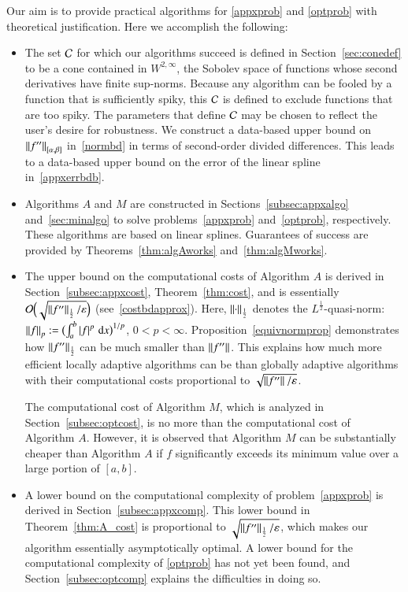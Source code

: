 \documentclass[review]{elsarticle}
\newcommand{\abstol}{\varepsilon}
\theoremstyle{definition}
\renewcommand{\cw}{W}
\begin{document}
Our aim is to provide practical algorithms for \eqref{appxprob} and  \eqref{optprob} with theoretical justification.  Here we accomplish the following:
\begin{itemize}

\item The set $\cc$ for which our algorithms succeed is defined in Section~\ref{sec:conedef} to be a cone contained in $\cw^{2,\infty}$, the Sobolev space of functions whose second derivatives have finite sup-norms.  Because any algorithm can be fooled by a function that is sufficiently spiky, this $\cc$ is defined to exclude functions that are too spiky.  The parameters that define $\cc$ may be chosen to reflect the user's desire for robustness.  We construct a data-based upper bound on $\norm[{[\alpha,\beta]}]{f''}$ in~\eqref{normbd} in terms of second-order divided differences.  This leads to a data-based upper bound on the error of the linear spline in~\eqref{appxerrbdb}.

\item Algorithms $A$ and $M$ are constructed in Sections~\ref{subsec:appxalgo} and~\ref{sec:minalgo} to solve problems~\eqref{appxprob}
and~\eqref{optprob}, respectively.  These algorithms are based on linear splines.  Guarantees of success are provided by Theorems~\ref{thm:algAworks}
and~\ref{thm:algMworks}.

\item The upper bound on the computational costs of Algorithm $A$ is derived in Section~\ref{subsec:appxcost},  Theorem~\ref{thm:cost}, and is essentially $\Order\Bigl(\sqrt{\norm[\frac12]{f''}/\abstol}\Bigr)$ (see~\eqref{costbdapprox}).  Here, $\norm[\frac12]{\cdot}$ denotes the $L^{\frac12}$-quasi-norm:  $\norm[p]{f} := \bigl(\int_a^b \abs{f}^p \, \dif x \bigr)^{1/p}$, $0 < p < \infty$.  Proposition~\ref{equivnormprop} demonstrates how $\norm[\frac12]{f''}$ can be much smaller than $\norm{f''}$.  This explains how much more efficient locally adaptive algorithms can be than globally adaptive algorithms with their computational costs  proportional to $\sqrt{\norm{f''}/\abstol}$.  

The computational cost of Algorithm $M$, which is analyzed in Section~\ref{subsec:optcost}, is no more than the computational cost of Algorithm $A$.  However, it is observed that Algorithm $M$ can be substantially cheaper than Algorithm $A$ if $f$ significantly exceeds its minimum value over a large portion of $[a,b]$.

\item A lower bound on the computational complexity of problem~\eqref{appxprob} is derived in Section~\ref{subsec:appxcomp}.  This lower bound in Theorem~\ref{thm:A_cost} is proportional to $\sqrt{\norm[\frac12]{f''}/\abstol}$, which makes our algorithm essentially asymptotically optimal.  A lower bound for the computational complexity of  \eqref{optprob} has not yet been found, and Section~\ref{subsec:optcomp} explains the difficulties in doing so.


\end{itemize}
\end{document}
